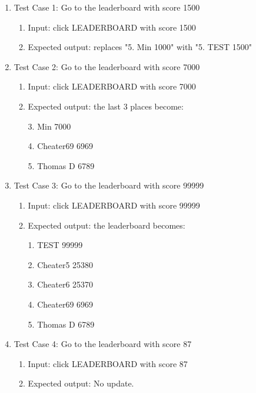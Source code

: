 \documentclass[11pt]{article}
\begin{document}
    \begin{enumerate}
        \item Test Case 1: Go to the leaderboard with score 1500
        \begin{enumerate}
            \item  Input: click LEADERBOARD with score 1500
            \item  Expected output: replaces "5. Min 1000" with "5. TEST 1500"
        \end{enumerate}
        \item Test Case 2: Go to the leaderboard with score 7000
        \begin{enumerate}
            \item  Input: click LEADERBOARD with score 7000
            \item  Expected output: the last 3 places become: 
    
                3. Min       7000

                4. Cheater69 6969

                5. Thomas D  6789
            
        \end{enumerate}
        \item Test Case 3: Go to the leaderboard with score 99999
        \begin{enumerate}
            \item  Input: click LEADERBOARD with score 99999
            \item   Expected output: the leaderboard becomes:
         
                1. TEST     99999

                2. Cheater5 25380

                3. Cheater6 25370

                4. Cheater69 6969
                
                5. Thomas D  6789
       
        \end{enumerate}
        \item Test Case 4: Go to the leaderboard with score 87
        \begin{enumerate}
            \item  Input: click LEADERBOARD with score 87
            \item  Expected output: No update.
        \end{enumerate}
    \end{enumerate}
\end{document}
